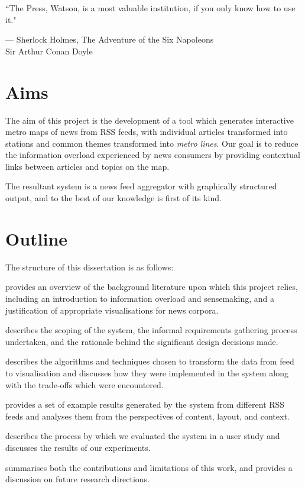 \vspace{-1cm}
\epigraph{``The Press, Watson, is a most valuable institution, if you only know how to use it."}{--- \textup{Sherlock Holmes}, The Adventure of the Six Napoleons\\[0.2cm] \textup{Sir Arthur Conan Doyle}}

\section*{Aims}
The aim of this project is the development of a tool which generates interactive metro maps of news from RSS feeds, with individual articles transformed into stations and common themes transformed into \textit{metro lines}. Our goal is to reduce the information overload experienced by news consumers by providing contextual links between articles and topics on the map.

The resultant system is a news feed aggregator with graphically structured output, and to the best of our knowledge is first of its kind.

\section*{Outline}
The structure of this dissertation is as follows:
\begin{description}[leftmargin=5.6em,style=nextline]
	\item [Chapter \ref{c:litreview}] provides an overview of the background literature upon which this project relies, including an introduction to information overload and sensemaking, and a justification of appropriate visualisations for news corpora.
	\item [Chapter \ref{c:reqs}] describes the scoping of the system, the informal requirements gathering process undertaken, and the rationale behind the significant design decisions made.
	\item [Chapter \ref{c:implementation}] describes the algorithms and techniques chosen to transform the data from feed to visualisation and discusses how they were implemented in the system along with the trade-offs which were encountered.
	\item [Chapter \ref{c:results}] provides a set of example results generated by the system from different RSS feeds and analyses them from the perspectives of content, layout, and context.
	\item [Chapter \ref{c:evaluation}] describes the process by which we evaluated the system in a user study and discusses the results of our experiments.
	\item [Chapter \ref{c:conclusions}] summarises both the contributions and limitations of this work, and provides a discussion on future research directions.
\end{description}

